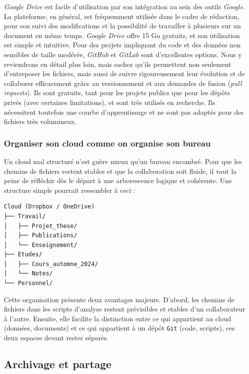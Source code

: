 \documentclass[
  letterpaper,
  DIV=11,
  numbers=noendperiod,
  oneside]{scrreprt}
\begin{document}
\emph{Google Drive} est facile d'utilisation par son intégration au sein
des outils \emph{Google}. La plateforme, en général, est fréquemment
utilisée dans le cadre de rédaction, pour son suivi des modifications et
la possibilité de travailler à plusieurs sur un document en même temps.
\emph{Google Drive} offre 15 Go gratuits, et son utilisation est simple
et intuitive. Pour des projets impliquant du code et des données non
sensibles de taille modérée, \emph{GitHub} et \emph{GitLab} sont
d'excellentes options. Nous y reviendrons en détail plus loin, mais
sachez qu'ils permettent non seulement d'entreposer les fichiers, mais
aussi de suivre rigoureusement leur évolution et de collaborer
efficacement grâce au versionnement et aux demandes de fusion
(\emph{pull requests}). Ils sont gratuits, tant pour les projets publics
que pour les dépôts privés (avec certaines limitations), et sont très
utilisés en recherche. Ils nécessitent toutefois une courbe
d'apprentissage et ne sont pas adaptés pour des fichiers très
volumineux.

\hypertarget{organiser-son-cloud-comme-on-organise-son-bureau}{%
\subsubsection{Organiser son cloud comme on organise son
bureau}\label{organiser-son-cloud-comme-on-organise-son-bureau}}

Un cloud mal structuré n'est guère mieux qu'un bureau encombré. Pour que
les chemins de fichiers restent stables et que la collaboration soit
fluide, il vaut la peine de réfléchir dès le départ à une arborescence
logique et cohérente. Une structure simple pourrait ressembler à ceci :

\begin{verbatim}
Cloud (Dropbox / OneDrive)
├── Travail/
│   ├── Projet_these/
│   ├── Publications/
│   └── Enseignement/
├── Etudes/
│   ├── Cours_automne_2024/
│   └── Notes/
└── Personnel/
\end{verbatim}

Cette organisation présente deux avantages majeurs. D'abord, les chemins
de fichiers dans les scripts d'analyse restent prévisibles et stables
d'un collaborateur à l'autre. Ensuite, elle facilite la distinction
entre ce qui appartient au cloud (données, documents) et ce qui
appartient à un dépôt \texttt{Git} (code, scripts), ces deux espaces
devant rester séparés.

\hypertarget{archivage-et-partage}{%
\subsection{Archivage et partage}\label{archivage-et-partage}}
\end{document}
